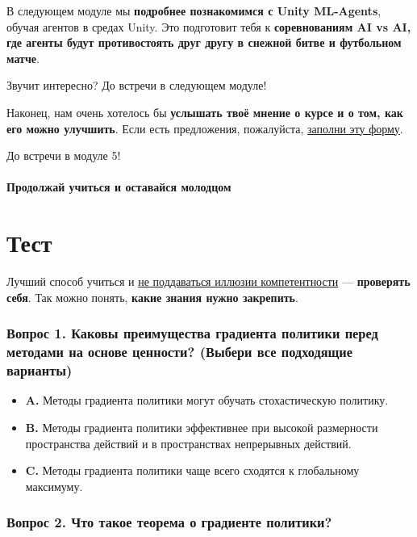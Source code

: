 \documentclass[11pt,a4paper]{article}
\begin{document}
В следующем модуле мы \textbf{подробнее познакомимся с Unity ML-Agents}, обучая агентов в средах Unity. Это подготовит тебя к \textbf{соревнованиям AI vs AI, где агенты будут противостоять друг другу в снежной битве и футбольном матче}.

Звучит интересно? До встречи в следующем модуле!

Наконец, нам очень хотелось бы \textbf{услышать твоё мнение о курсе и о том, как его можно улучшить}. Если есть предложения, пожалуйста, \href{https://forms.gle/BzKXWzLAGZESGNaE9}{заполни эту форму}.

До встречи в модуле 5!

\paragraph{Продолжай учиться и оставайся молодцом}\label{keep-learning-stay-awesome}

\section{Тест}\label{quiz}

Лучший способ учиться и \href{https://www.coursera.org/lecture/learning-how-to-learn/illusions-of-competence-BuFzf}{не поддаваться иллюзии компетентности} --- \textbf{проверять себя}. Так можно понять, \textbf{какие знания нужно закрепить}.

\subsubsection{Вопрос 1. Каковы преимущества градиента политики перед методами на основе ценности? (Выбери все подходящие варианты)}\label{q1-what-are-the-advantages-of-policy-gradient-over-value-based-methods-check-all-that-apply}

\begin{itemize}
\tightlist
\item
  \textbf{A.} Методы градиента политики могут обучать стохастическую политику.
\item
  \textbf{B.} Методы градиента политики эффективнее при высокой размерности пространства действий и в пространствах непрерывных действий.
\item
  \textbf{C.} Методы градиента политики чаще всего сходятся к глобальному максимуму.
\end{itemize}

\subsubsection{Вопрос 2. Что такое теорема о градиенте политики?}\label{q2-what-is-the-policy-gradient-theorem}
\end{document}
